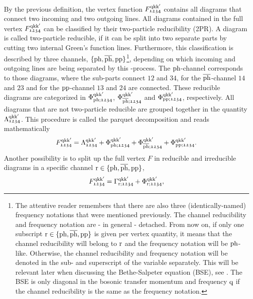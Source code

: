 \documentclass[\main/main.tex]{subfiles}
\begin{document}
By the previous definition, the vertex function $F_{\mathfrak{1234}}^{\text{q}\text{k}\text{k}'}$ contains all diagrams that connect two incoming and two outgoing lines. All diagrams contained in the full vertex $F_{\mathfrak{1234}}^{\text{q}\text{k}\text{k}'}$ can be classified by their two-particle reducibility (2PR). A diagram is called two-particle reducible, if it can be split into two separate parts by cutting two internal Green's function lines. Furthermore, this classification is described by three channels, $\{\text{ph},\overline{\text{ph}},\text{pp}\}$\footnote{The attentive reader remembers that there are also three (identically-named) frequency notations that were mentioned previously. The channel reducibility and frequency notation are - in general - detached. From now on, if only one subscript $\text{r}\in\{\text{ph},\overline{\text{ph}},\text{pp}\}$ is given per vertex quantity, it means that the channel reducibility will belong to $\text{r}$ and the frequency notation will be $\text{ph}$-like. Otherwise, the channel reducibility and frequency notation will be denoted in the sub- and superscript of the variable separately. This will be relevant later when discussing the Bethe-Salpeter equation (BSE), see . The BSE is only diagonal in the bosonic transfer momentum and frequency $\text{q}$ if the channel reducibility is the same as the frequency notation.}, depending on which incoming and outgoing lines are being separated by this -process. The $\text{ph}$-channel corresponds to those diagrams, where the sub-parts connect $\mathfrak{12}$ and $\mathfrak{34}$, for the $\overline{\text{ph}}$-channel $\mathfrak{14}$ and $\mathfrak{23}$ and for the $\text{pp}$-channel $\mathfrak{13}$ and $\mathfrak{24}$ are connected. These reducible diagrams are categorized in $\Phi_{\text{ph};\mathfrak{1234}}^{\text{q}\text{k}\text{k}'}$, $\Phi_{\overline{\text{ph}};\mathfrak{1234}}^{\text{q}\text{k}\text{k}'}$ and $\Phi_{\text{pp};\mathfrak{1234}}^{\text{q}\text{k}\text{k}'}$, respectively. All diagrams that are not two-particle reducible are grouped together in the quantity $\Lambda_{\mathfrak{1234}}^{\text{q}\text{k}\text{k}'}$. This procedure is called the parquet decomposition and reads mathematically
\begin{align}\label{eq:parquet_decomposition}
	F_{\mathfrak{1234}}^{\text{q}\text{k}\text{k}'}=\Lambda_{\mathfrak{1234}}^{\text{q}\text{k}\text{k}'}+\Phi_{\text{ph};\mathfrak{1234}}^{\text{q}\text{k}\text{k}'}+\Phi_{\overline{\text{ph}};\mathfrak{1234}}^{\text{q}\text{k}\text{k}'}+\Phi_{\text{pp};\mathfrak{1234}}^{\text{q}\text{k}\text{k}'}.
\end{align}
Another possibility is to split up the full vertex $F$ in reducible and irreducible diagrams in a specific channel $\text{r}\in\{\text{ph},\overline{\text{ph}},\text{pp}\}$,
\begin{align}\label{eq:full_vertex_gamma_phi}
	F_{\mathfrak{1234}}^{\text{q}\text{k}\text{k}'}=\Gamma_{\text{r};\mathfrak{1234}}^{\text{q}\text{k}\text{k}'}+\Phi_{\text{r};\mathfrak{1234}}^{\text{q}\text{k}\text{k}'},
\end{align}
\end{document}
